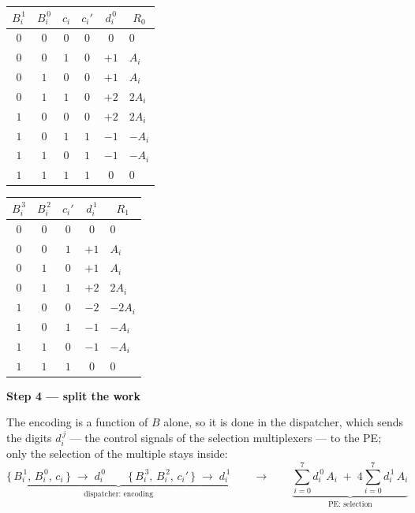 \documentclass[fleqn]{article}
\begin{document}
\begin{center}
\renewcommand{\arraystretch}{1.1}
\begin{tabular}{c c c | c | c | l}
$B_i^{\,1}$ & $B_i^{\,0}$ & $c_i$ & $c_i'$ & $d_i^{\,0}$ & \multicolumn{1}{c}{$R_0$} \\
\hline
$0$ & $0$ & $0$ & $0$ & $0$  & $0$ \\
$0$ & $0$ & $1$ & $0$ & $+1$ & $A_i$ \\
$0$ & $1$ & $0$ & $0$ & $+1$ & $A_i$ \\
$0$ & $1$ & $1$ & $0$ & $+2$ & $2A_i$ \\
$1$ & $0$ & $0$ & $0$ & $+2$ & $2A_i$ \\
$1$ & $0$ & $1$ & $1$ & $-1$ & $-A_i$ \\
$1$ & $1$ & $0$ & $1$ & $-1$ & $-A_i$ \\
$1$ & $1$ & $1$ & $1$ & $0$  & $0$ \\
\end{tabular}
\qquad\qquad
\begin{tabular}{c c c | c | l}
$B_i^{\,3}$ & $B_i^{\,2}$ & $c_i'$ & $d_i^{\,1}$ & \multicolumn{1}{c}{$R_1$} \\
\hline
$0$ & $0$ & $0$ & $0$  & $0$ \\
$0$ & $0$ & $1$ & $+1$ & $A_i$ \\
$0$ & $1$ & $0$ & $+1$ & $A_i$ \\
$0$ & $1$ & $1$ & $+2$ & $2A_i$ \\
$1$ & $0$ & $0$ & $-2$ & $-2A_i$ \\
$1$ & $0$ & $1$ & $-1$ & $-A_i$ \\
$1$ & $1$ & $0$ & $-1$ & $-A_i$ \\
$1$ & $1$ & $1$ & $0$  & $0$ \\
\end{tabular}
\end{center}

\vspace{0.5em}

\noindent\textbf{Step 4 --- split the work}

\noindent The encoding is a function of $B$ alone, so it is done in the dispatcher, which
sends the digits $d_i^{\,j}$ --- the control signals of the selection multiplexers --- to the
PE; only the selection of the multiple stays inside:
\[
\underbrace{\bigl\{\, B_i^{\,1},\, B_i^{\,0},\, c_i \,\bigr\} \;\longrightarrow\; d_i^{\,0}
  \qquad
  \bigl\{\, B_i^{\,3},\, B_i^{\,2},\, c_i' \,\bigr\} \;\longrightarrow\; d_i^{\,1}}_{\textstyle \text{dispatcher: encoding}}
\qquad\longrightarrow\qquad
\underbrace{\sum_{i=0}^{7} d_i^{\,0} \, A_i \;+\; 4 \sum_{i=0}^{7} d_i^{\,1} \, A_i}_{\textstyle \text{PE: selection}}
\]
\end{document}
